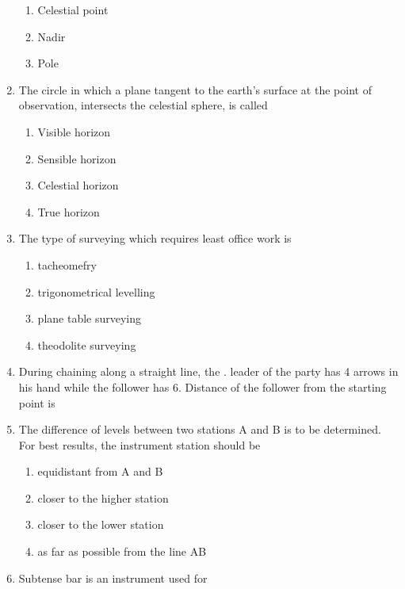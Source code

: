 \documentclass[11pt,a4paper]{article}
\begin{document}
\begin{enumerate}
\begin{enumerate}[label=\Alph*.]
\item{Celestial point}
\item{Nadir}
\item{Pole}
\end{enumerate}
\item{The circle in which a plane tangent to the earth's surface at the point of observation, intersects the celestial sphere, is called}
\begin{enumerate}[label=\Alph*.]
\item{Visible horizon}
\item{Sensible horizon}
\item{Celestial horizon}
\item{True horizon}
\end{enumerate}
\item{The type of surveying which requires least office work is}
\begin{enumerate}[label=\Alph*.]
\item{tacheomefry}
\item{trigonometrical levelling}
\item{plane table surveying}
\item{theodolite surveying}
\end{enumerate}
\item{During chaining along a straight line, the . leader of the party has 4 arrows in his hand while the follower has 6. Distance of the follower from the starting point is}
\\
\item{The difference of levels between two stations A and B is to be determined. For best results, the instrument station should be}
\begin{enumerate}[label=\Alph*.]
\item{equidistant from A and B}
\item{closer to the higher station}
\item{closer to the lower station}
\item{as far as possible from the line AB}
\end{enumerate}
\item{Subtense bar is an instrument used for}

\end{enumerate}
\end{document}
